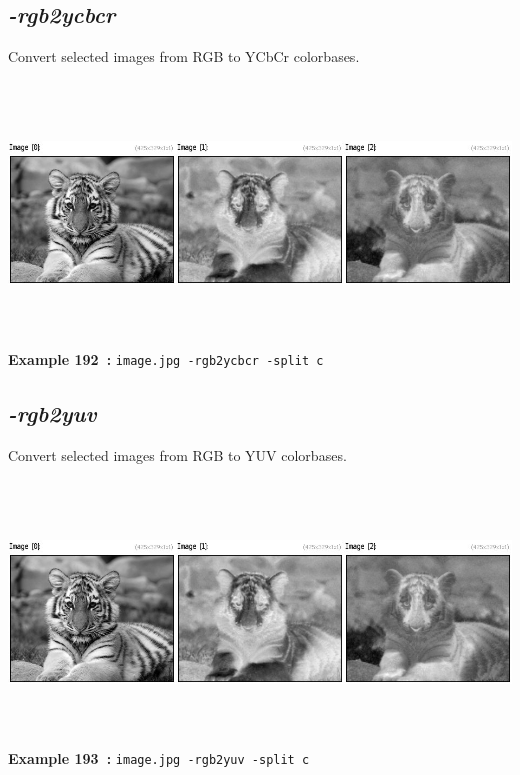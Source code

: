 \documentclass[a4paper,11pt,twoside]{book}
\begin{document}
\subsection{\emph{-rgb2ycbcr} }\vspace*{-0.5em}
Convert selected images from RGB to YCbCr colorbases.
\begin{center}\includegraphics[keepaspectratio=true,height=7cm,width=\textwidth]{img/gmic_def192.jpg}\\
{\footnotesize \textbf{Example 192~:} \texttt{image.jpg -rgb2ycbcr -split c}}
\end{center}

\subsection{\emph{-rgb2yuv} }\vspace*{-0.5em}
Convert selected images from RGB to YUV colorbases.
\begin{center}\includegraphics[keepaspectratio=true,height=7cm,width=\textwidth]{img/gmic_def193.jpg}\\
{\footnotesize \textbf{Example 193~:} \texttt{image.jpg -rgb2yuv -split c}}
\end{center}
\end{document}
